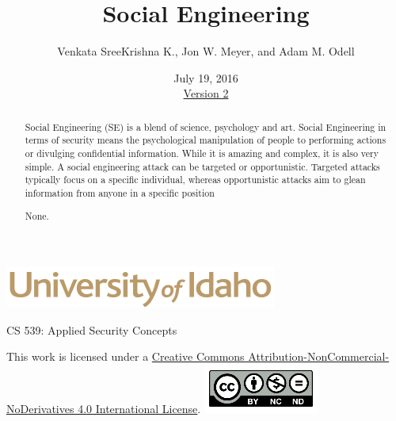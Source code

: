 \documentclass[12pt]{extarticle}
\begin{document}
\title{ Social Engineering \\ \large}
\author{Venkata SreeKrishna K., Jon W. Meyer, and Adam M. Odell}
\date{July 19, 2016 \\ \hyperref[changelog]{Version 2}} %
\renewcommand{\abstractname}{Executive Summary}
\begin{titlepage}
\maketitle
{}
\begin{center}
\includegraphics[scale=.5]{UofI}

\large{CS 539: Applied Security Concepts}

\vskip 40pt

\end{center}
\begin{abstract}
Social Engineering (SE) is a blend of science, psychology and art. Social Engineering in terms of security means the psychological manipulation of people to performing actions or divulging confidential information. While it is amazing and complex, it is also very simple. A social engineering attack can be targeted or opportunistic. Targeted attacks typically focus on a specific individual, whereas opportunistic attacks aim to glean information from anyone in a specific position


None.
\end{abstract}


\vfill
\begin{center}
This work is licensed under a \href{http://creativecommons.org/licenses/by/4.0/}{Creative Commons Attribution-NonCommercial-NoDerivatives 4.0 International License}.
\vskip 10pt
\includegraphics[scale=.5]{cc}
\end{center}

\end{titlepage}


\pagebreak
\tableofcontents
\end{document}
